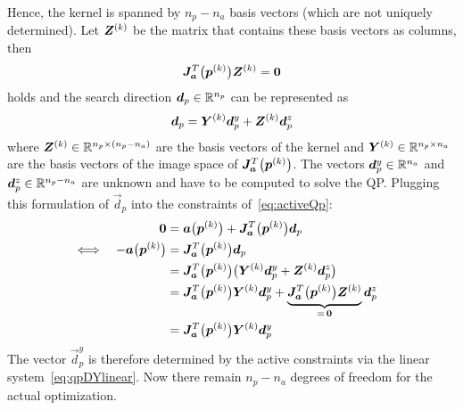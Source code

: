 				Hence, the kernel is spanned by \( n_p - n_a \) basis vectors (which are not uniquely determined). Let \( \bm{Z}^{(k)} \) be the matrix that contains these basis vectors as columns, then
				\begin{align*}
					\bm{J}_{\bm{a}}^T\big(\bm{p}^{(k)}\big) \bm{Z}^{(k)} = \bm{0}
				\end{align*}
				holds and the search direction \( \bm{d}_p \in \mathbb{R}^{n_p} \) can be represented as
				\begin{align*}
					\bm{d}_p = \bm{Y}^{(k)} \bm{d}_p^y + \bm{Z}^{(k)} \bm{d}_p^z
				\end{align*}
				where \( \bm{Z}^{(k)} \in \mathbb{R}^{n_p \times (n_p - n_a)} \) are the basis vectors of the kernel and \( \bm{Y}^{(k)} \in \mathbb{R}^{n_p \times n_a} \) are the basis vectors of the image space of \( \bm{J}_{\bm{a}}^T\big(\bm{p}^{(k)}\big) \). The vectors \( \bm{d}_p^y \in \mathbb{R}^{n_a} \) and \( \bm{d}_p^z \in \mathbb{R}^{n_p - n_a} \) are unknown and have to be computed to solve the QP. Plugging this formulation of \( \vec{d}_p \) into the constraints of~\eqref{eq:activeQp}:
				\begin{align}
					&& \bm{0} &= \bm{a}\big(\bm{p}^{(k)}\big) + \bm{J}_{\bm{a}}^T\big(\bm{p}^{(k)}\big) \bm{d}_p &  \nonumber \\
					\iff && -\bm{a}\big(\bm{p}^{(k)}\big) &= \bm{J}_{\bm{a}}^T\big(\bm{p}^{(k)}\big) \bm{d}_p &  \nonumber \\
					     &&  &= \bm{J}_{\bm{a}}^T\big(\bm{p}^{(k)}\big) \big( \bm{Y}^{(k)} \bm{d}_p^y + \bm{Z}^{(k)} \bm{d}_p^z \big) &  \nonumber \\
					     &&  &= \bm{J}_{\bm{a}}^T\big(\bm{p}^{(k)}\big) \bm{Y}^{(k)} \bm{d}_p^y + \underbrace{\bm{J}_{\bm{a}}^T\big(\bm{p}^{(k)}\big) \bm{Z}^{(k)}}_{=\, \bm{0}} \bm{d}_p^z &  \nonumber \\
					     &&  &= \bm{J}_{\bm{a}}^T\big(\bm{p}^{(k)}\big) \bm{Y}^{(k)} \bm{d}_p^y &  \label{eq:qpDYlinear}
				\end{align}
				The vector \( \vec{d}_p^y \) is therefore determined by the active constraints via the linear system~\eqref{eq:qpDYlinear}. Now there remain \( n_p - n_a \) degrees of freedom for the actual optimization.

